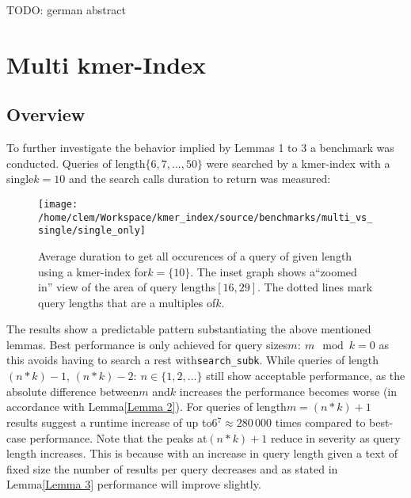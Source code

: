 \begin{abstractDE}
TODO: german abstract
\end{abstractDE}
\vfill

\tableofcontents{}
\setcounter{page}{1}






\chapter{Multi kmer-Index}

\section{\label{subsec: multi k overview}Overview}

To further investigate the behavior implied by Lemmas 1 to 3 a benchmark
was conducted. Queries of length$\{6,7,...,50\}$ were searched by
a kmer-index with a single$k=10$ and the search calls duration to
return was measured:

\begin{figure}[H]
\texttt{[image: /home/clem/Workspace/kmer\_index/source/benchmarks/multi\_vs\_single/single\_only]}

\caption{\label{figure 1}Average duration to get all occurences of a query
of given length using a kmer-index for$k=\{10\}$. The inset graph
shows a``zoomed in'' view of the area of query lengths$[16,29]$.
The dotted lines mark query lengths that are a multiples of$k$.}

\end{figure}

The results show a predictable pattern substantiating the above mentioned
lemmas. Best performance is only achieved for query sizes$m:\:m\mod k=0$
as this avoids having to search a rest with\lstinline{search_subk}.
While queries of length$(n*k)-1,\,(n*k)-2:\:n\in\{1,2,...\}$ still
show acceptable performance, as the absolute difference between$m$
and$k$ increases the performance becomes worse (in accordance with
Lemma\ref{Lemma 2}). For queries of length$m=(n*k)+1$ results suggest
a runtime increase of up to$6{{}^7}\approx280\,000$ times compared
to best-case performance. Note that the peaks at$(n*k)+1$ reduce
in severity as query length increases. This is because with an increase
in query length given a text of fixed size the number of results per
query decreases and as stated in Lemma\ref{Lemma 3} performance will
improve slightly.

